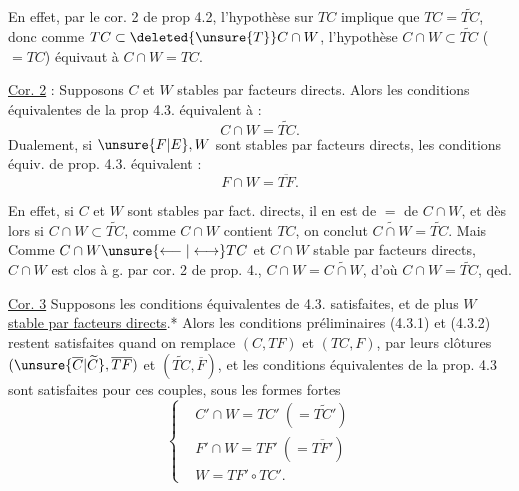 
En effet, par le cor. 2 de prop 4.2, l'hypothèse sur $TC$
implique que $TC=\widetilde{TC}$, donc comme $TC\subset\deleted{\unsure{T}}C\cap W$,
l'hypothèse $C\cap W\subset\widetilde{TC}$ ($=TC$) équivaut à $C\cap W=TC$.

\uline{Cor. 2} : Supposons $C$ et $W$ stables par facteurs
directs. Alors les conditions équivalentes de
la prop 4.3. équivalent à :
\[
C\cap W=\widetilde{TC}.
\tag*{(4.3.5.)}
\]
Dualement, si $\unsure{F|E},W$ sont stables par facteurs directs,
les conditions équiv. de prop. 4.3. équivalent :
\[
F\cap W=\overline{TF}.
\tag*{(4.3.5$'$)}
\]

En effet, si $C$ et $W$ sont stables par fact. directs,
il en est de $=$ de $C\cap W$, et  dès
lors si $C\cap W\subset\widetilde{TC}$, comme $C\cap W$ contient $TC$,
 on conclut $\widetilde{C\cap W}=\widetilde{TC}$. Mais
 Comme $C\cap W\unsure{\longleftarrow|\longleftrightarrow} TC$ et $C\cap W$
stable par facteurs directs, $C\cap W$ est clos à g.
par cor. 2 de prop. 4.,  $C\cap W=\widetilde{C\cap W}$,
d'où $C\cap W=\widetilde{TC}$, qed.

\uline{Cor. 3} Supposons les conditions équivalentes  de
4.3. satisfaites, et de plus \uline{$W$ stable par
facteurs directs}.* Alors les conditions préliminaires
(4.3.1) et (4.3.2) restent satisfaites quand on
remplace $(C,TF)$ et $(TC,F)$, par leurs
clôtures $(\unsure{\overline C|\widetilde C},\overline{TF})$ et $(\widetilde{TC},\overline F)$,
et les conditions équivalentes de la prop. 4.3 sont  satisfaites
 pour ces couples, sous les formes fortes
\[
\left\{\begin{aligned}
&C'\cap W=TC'\ (= \widetilde{TC'})\\
&F'\cap W=TF'\ (= \overline{TF'})\\
&W=TF'\circ TC'.
\end{aligned}\right.
\tag*{(4.3.6)}
\]
